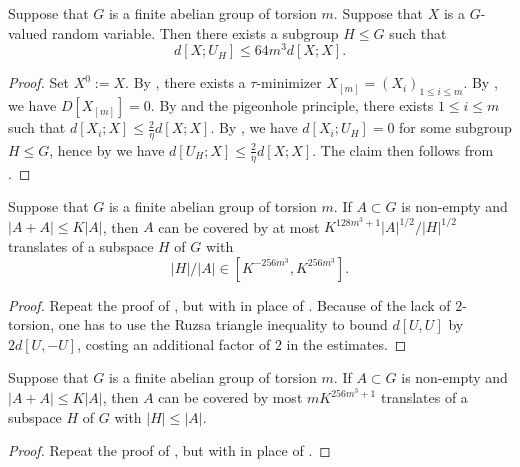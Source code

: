\begin{theorem}\label{main-entropy}\leanok Suppose that $G$ is a finite abelian group of torsion $m$.  Suppose that $X$ is a $G$-valued random variable. Then there exists a subgroup $H \leq G$ such that \[ d[X;U_H] \leq 64 m^3 d[X;X].\]
\end{theorem}

\begin{proof}\leanok  Set $X^0 := X$. By , there exists a $\tau$-minimizer $X_{[m]} = (X_i)_{1 \leq i \leq m}$.  By , we have $D[X_{[m]}]=0$. By  and the pigeonhole principle, there exists $1 \leq i \leq m$ such that $d[X_i; X] \leq \frac{2}{\eta} d[X;X]$.  By , we have $d[X_i;U_H]=0$ for some subgroup $H \leq G$, hence by  we have $d[U_H; X] \leq \frac{2}{\eta} d[X;X]$. The claim then follows from .
\end{proof}

\begin{lemma}\label{pfr_aux_torsion}\leanok  Suppose that $G$ is a finite abelian group of torsion $m$.  If $A \subset G$ is non-empty and
  $|A+A| \leq K|A|$, then $A$ can be covered by at most $K ^
  {128m^3+1}|A|^{1/2}/|H|^{1/2}$ translates of a subspace $H$ of $G$ with
  \begin{equation}
    \label{ah2}
    |H|/|A| \in [K^{-256m^3}, K^{256m^3}].
  \end{equation}
  \end{lemma}

\begin{proof}\leanok  Repeat the proof of , but with  in place of .  Because of the lack of $2$-torsion, one has to use the Ruzsa triangle inequality to bound $d[U,U]$ by $2d[U,-U]$, costing an additional factor of $2$ in the estimates.
\end{proof}

\begin{theorem}[PFR]\label{pfr-torsion}\leanok  Suppose that $G$ is a finite abelian group of torsion $m$.
  If $A \subset G$ is non-empty and $|A+A| \leq K|A|$, then $A$ can be covered by most $mK^{256m^3+1}$ translates of a subspace $H$ of $G$ with $|H| \leq |A|$.
  \end{theorem}

  \begin{proof}\leanok Repeat the proof of , but with  in place of .
  \end{proof}

